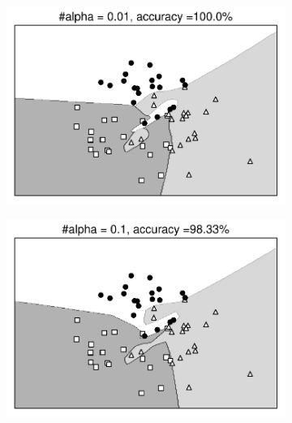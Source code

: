 \begin{figure}[t]
    \begin{subfigure}{0.45\textwidth}
    \includegraphics[width=0.99\linewidth]{ebookML_src/src/mlp/nn_overfitting_001.pdf}
    \caption{}
    \end{subfigure}
    \begin{subfigure}{0.45\textwidth}
    \includegraphics[width=0.99\linewidth]{ebookML_src/src/mlp/nn_overfitting_01.pdf}
    \caption{}
    \end{subfigure}


\end{figure}
